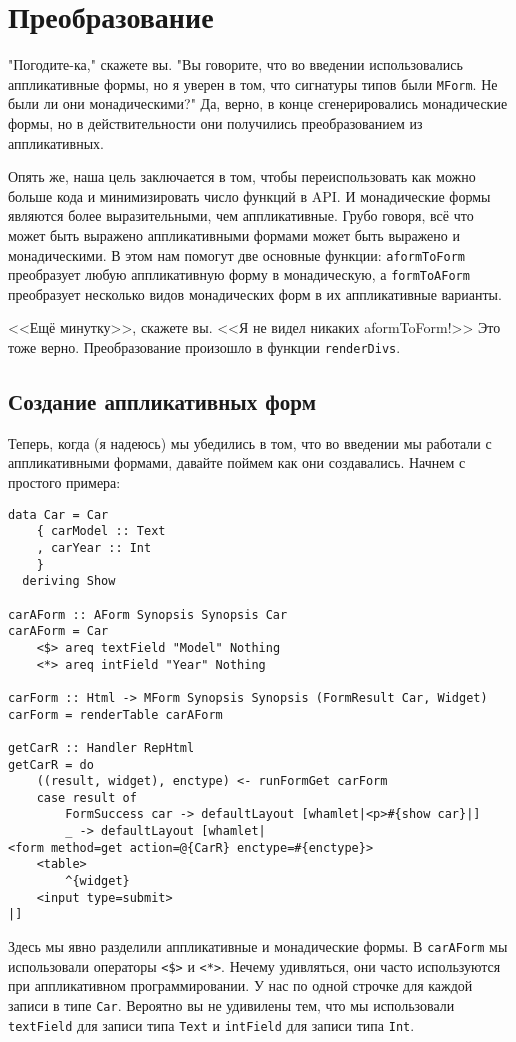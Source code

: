 \section{Преобразование}
"Погодите-ка," скажете вы. "Вы говорите, что во введении использовались аппликативные
формы, но я уверен в том, что сигнатуры типов были \lstinline'MForm'. Не были ли
они монадическими?" Да, верно, в конце сгенерировались монадические формы, но в
действительности они получились преобразованием из аппликативных.

Опять же, наша цель заключается в том, чтобы переиспользовать как можно больше кода и
минимизировать число функций в API. И монадические формы являются более
выразительными, чем аппликативные. Грубо говоря, всё что может быть выражено
аппликативными формами может быть выражено и монадическими. В этом нам помогут две
основные функции: \lstinline'aformToForm' преобразует любую аппликативную форму в
монадическую, а \lstinline'formToAForm' преобразует несколько видов монадических форм в их
аппликативные варианты.

<<Ещё минутку>>, скажете вы. <<Я не видел никаких aformToForm!>> Это тоже верно.
Преобразование произошло в функции \lstinline'renderDivs'.

\subsection{Создание аппликативных форм}
Теперь, когда (я надеюсь) мы убедились в том, что во введении мы работали с
аппликативными формами, давайте поймем как они создавались. Начнем с простого примера:

\begin{lstlisting}
data Car = Car
    { carModel :: Text
    , carYear :: Int
    }
  deriving Show

carAForm :: AForm Synopsis Synopsis Car
carAForm = Car
    <$> areq textField "Model" Nothing
    <*> areq intField "Year" Nothing

carForm :: Html -> MForm Synopsis Synopsis (FormResult Car, Widget)
carForm = renderTable carAForm

getCarR :: Handler RepHtml
getCarR = do
    ((result, widget), enctype) <- runFormGet carForm
    case result of
        FormSuccess car -> defaultLayout [whamlet|<p>#{show car}|]
        _ -> defaultLayout [whamlet|
<form method=get action=@{CarR} enctype=#{enctype}>
    <table>
        ^{widget}
    <input type=submit>
|]
\end{lstlisting}
Здесь мы явно разделили аппликативные и монадические формы. В \lstinline'carAForm' мы
использовали операторы \lstinline'<$>' и \lstinline'<*>'. Нечему удивляться, они
часто используются при аппликативном программировании. У нас по одной строчке для
каждой записи в типе \lstinline'Car'. Вероятно вы не удивилены тем, что мы использовали 
\lstinline'textField' для записи типа \lstinline'Text' и \lstinline'intField' для записи
типа \lstinline'Int'.

